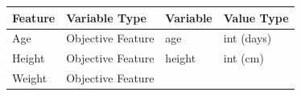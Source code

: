 \documentclass[11pt]{article}
\begin{document}
\begin{longtable}[]{@{}llll@{}}
\toprule
\begin{minipage}[b]{0.12\columnwidth}\raggedright\strut
Feature\strut
\end{minipage} & \begin{minipage}[b]{0.18\columnwidth}\raggedright\strut
Variable Type\strut
\end{minipage} & \begin{minipage}[b]{0.20\columnwidth}\raggedright\strut
Variable\strut
\end{minipage} & \begin{minipage}[b]{0.16\columnwidth}\raggedright\strut
Value Type\strut
\end{minipage}\tabularnewline
\midrule
\endhead
\begin{minipage}[t]{0.12\columnwidth}\raggedright\strut
Age\strut
\end{minipage} & \begin{minipage}[t]{0.18\columnwidth}\raggedright\strut
Objective Feature\strut
\end{minipage} & \begin{minipage}[t]{0.20\columnwidth}\raggedright\strut
age\strut
\end{minipage} & \begin{minipage}[t]{0.16\columnwidth}\raggedright\strut
int (days)\strut
\end{minipage}\tabularnewline
\begin{minipage}[t]{0.12\columnwidth}\raggedright\strut
Height\strut
\end{minipage} & \begin{minipage}[t]{0.18\columnwidth}\raggedright\strut
Objective Feature\strut
\end{minipage} & \begin{minipage}[t]{0.20\columnwidth}\raggedright\strut
height\strut
\end{minipage} & \begin{minipage}[t]{0.16\columnwidth}\raggedright\strut
int (cm)\strut
\end{minipage}\tabularnewline
\begin{minipage}[t]{0.12\columnwidth}\raggedright\strut
Weight\strut
\end{minipage} & \begin{minipage}[t]{0.18\columnwidth}\raggedright\strut
Objective Feature\strut
\end{minipage} & \begin{minipage}[t]{0.20\columnwidth}\raggedright\strut

\end{minipage}
\end{longtable}
\end{document}
